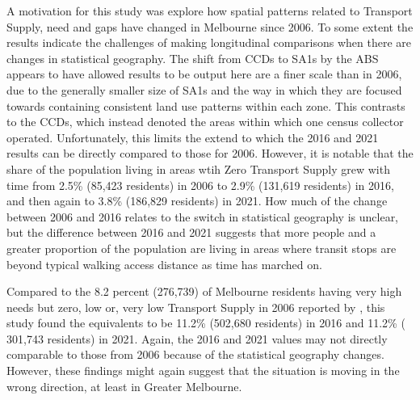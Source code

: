 \documentclass[preprint, 3p,
authoryear]{elsarticle} %
\begin{document}
A motivation for this study was explore how spatial patterns related to
Transport Supply, need and gaps have changed in Melbourne since 2006. To
some extent the results indicate the challenges of making longitudinal
comparisons when there are changes in statistical geography. The shift
from CCDs to SA1s by the ABS appears to have allowed results to be
output here are a finer scale than in 2006, due to the generally smaller
size of SA1s and the way in which they are focused towards containing
consistent land use patterns within each zone. This contrasts to the
CCDs, which instead denoted the areas within which one census collector
operated. Unfortunately, this limits the extend to which the 2016 and
2021 results can be directly compared to those for 2006. However, it is
notable that the share of the population living in areas wtih Zero
Transport Supply grew with time from 2.5\% (85,423 residents) in 2006 to
2.9\% (131,619 residents) in 2016, and then again to 3.8\% (186,829
residents) in 2021. How much of the change between 2006 and 2016 relates
to the switch in statistical geography is unclear, but the difference
between 2016 and 2021 suggests that more people and a greater proportion
of the population are living in areas where transit stops are beyond
typical walking access distance as time has marched on.

Compared to the 8.2 percent (276,739) of Melbourne residents having very
high needs but zero, low or, very low Transport Supply in 2006 reported
by \citet{currie2010identifying}, this study found the equivalents to be
11.2\% (502,680 residents) in 2016 and 11.2\% ( 301,743 residents) in
2021. Again, the 2016 and 2021 values may not directly comparable to
those from 2006 because of the statistical geography changes. However,
these findings might again suggest that the situation is moving in the
wrong direction, at least in Greater Melbourne.
\end{document}
